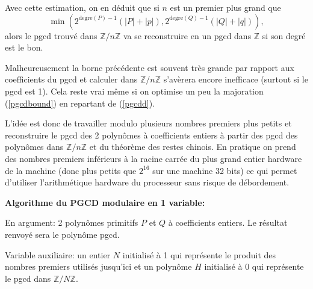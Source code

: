 \documentclass[a4paper,11pt]{article}
\begin{document}
Avec cette estimation, on en déduit que si $n$ est un premier plus grand que
\begin{equation}
  \text{$\min \left( 2^{\mbox{degre} ( P ) - 1} ( | P | + | p | ),
  2^{\mbox{degre} ( Q ) - 1} ( | Q | + | q | ) \right)$}, \label{pgcdbound}
\end{equation}
alors le pgcd trouvé dans $\mathbb{Z} / n \mathbb{Z}$ va se reconstruire en un
pgcd dans $\mathbb{Z}$ si son degré est le bon.

Malheureusement la borne précédente est souvent très grande par rapport aux
coefficients du pgcd et calculer dans $\mathbb{Z} / n \mathbb{Z}$ s'avèrera
encore inefficace (surtout si le pgcd est 1). Cela reste vrai même si on
optimise un peu la majoration (\ref{pgcdbound}) en repartant de (\ref{pgcdd}).

L'idée est donc de travailler modulo plusieurs nombres premiers plus petits et
reconstruire le pgcd des 2 polynômes à coefficients entiers à partir des pgcd
des polynômes dans $\text{$\mathbb{Z}$} / n \text{$\mathbb{Z}$}$ et du
théorème des restes chinois. En pratique on prend des nombres premiers
inférieurs à la racine carrée du plus grand entier hardware de la machine
(donc plus petits que $2^{16}$ sur une machine 32 bits) ce qui permet 
d'utiliser l'arithmétique hardware du processeur sans risque de débordement.

{\bf{Algorithme du PGCD modulaire en 1 variable:}}

En argument: 2 polynômes primitifs $P$ et $Q$ à coefficients entiers. Le
résultat renvoyé sera le polynôme pgcd.

Variable auxiliaire: un entier $N$ initialisé à 1 qui représente le produit
des nombres premiers utilisés jusqu'ici et un polynôme $H$ initialisé à 0 qui
représente le pgcd dans $\mathbb{Z} / N \mathbb{Z}$.
\end{document}
